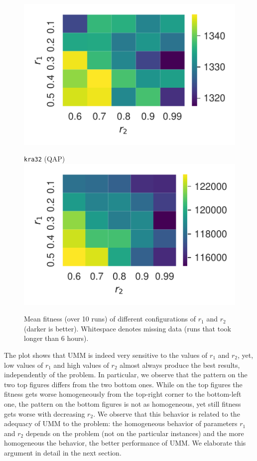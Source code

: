 \documentclass[runningheads]{llncs}
\begin{document}
\begin{figure}[tb]
\begin{minipage}{0.49\linewidth}
  \includegraphics[width=\textwidth]{../img/heatmap_rec05}
\end{minipage}
\begin{minipage}{0.49\linewidth}
  \centering
  \texttt{kra32} (QAP)\\[-0.5ex]
\includegraphics[width=\textwidth]{../img/heatmap_kra32_dat}
\end{minipage}
\caption{Mean fitness (over 10 runs) of different configurations of $r_1$ and $r_2$ (darker is better). Whitespace denotes missing data (runs that took longer than 6 hours).\label{fig:heatmaps}}
\end{figure}

The plot shows that UMM is indeed very sensitive to the values of $r_1$ and
$r_2$, yet, low values of $r_1$ and high values of $r_2$ almost always produce
the best results, independently of the problem.  In particular, we observe that
the pattern on the two top figures differs from the two bottom ones. While on
the top figures the fitness gets worse homogeneously from the top-right corner
to the bottom-left one, the pattern on the bottom figures is not as homogeneous, yet
still fitness gets worse with decreasing $r_2$.  We observe that this behavior
is related to the adequacy of UMM to the problem: the homogeneous behavior of
parameters $r_1$ and $r_2$ depends on the problem (not on the particular
instances) and the more homogeneous the behavior, the better performance of
UMM. We elaborate this argument in detail in the next section.
\end{document}
